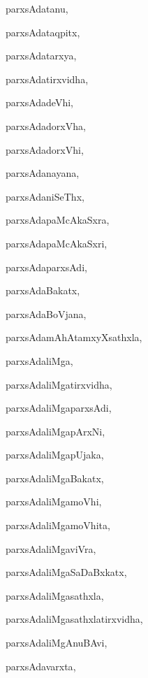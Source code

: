 \begin{multicols}{2}
{parxsAdatanu}, \pageref{parxsAdatanu}

{parxsAdataqpitx}, \pageref{parxsAdataqpitx}

{parxsAdatarxya}, \pageref{parxsAdatarxya}

{parxsAdatirxvidha}, \pageref{parxsAdatirxvidha}

{parxsAdadeVhi}, \pageref{parxsAdadeVhi}

{parxsAdadorxVha}, \pageref{parxsAdadorxVha}

{parxsAdadorxVhi}, \pageref{parxsAdadorxVhi}

{parxsAdanayana}, \pageref{parxsAdanayana}

{parxsAdaniSeThx}, \pageref{parxsAdaniSeThx}

{parxsAdapaMcAkaSxra}, \pageref{parxsAdapaMcAkaSxra}

{parxsAdapaMcAkaSxri}, \pageref{parxsAdapaMcAkaSxri}

{parxsAdaparxsAdi}, \pageref{parxsAdaparxsAdi}

{parxsAdaBakatx}, \pageref{parxsAdaBakatx}

{parxsAdaBoVjana}, \pageref{parxsAdaBoVjana}

{parxsAdamAhAtamxyXsathxla}, \pageref{parxsAdamAhAtamxyXsathxla}

{parxsAdaliMga}, \pageref{parxsAdaliMga}

{parxsAdaliMgatirxvidha}, \pageref{parxsAdaliMgatirxvidha}

{parxsAdaliMgaparxsAdi}, \pageref{parxsAdaliMgaparxsAdi}

{parxsAdaliMgapArxNi}, \pageref{parxsAdaliMgapArxNi}

{parxsAdaliMgapUjaka}, \pageref{parxsAdaliMgapUjaka}

{parxsAdaliMgaBakatx}, \pageref{parxsAdaliMgaBakatx}

{parxsAdaliMgamoVhi}, \pageref{parxsAdaliMgamoVhi}

{parxsAdaliMgamoVhita}, \pageref{parxsAdaliMgamoVhita}

{parxsAdaliMgaviVra}, \pageref{parxsAdaliMgaviVra}

{parxsAdaliMgaSaDaBxkatx}, \pageref{parxsAdaliMgaSaDaBxkatx}

{parxsAdaliMgasathxla}, \pageref{parxsAdaliMgasathxla}

{parxsAdaliMgasathxlatirxvidha}, \pageref{parxsAdaliMgasathxlatirxvidha}

{parxsAdaliMgAnuBAvi}, \pageref{parxsAdaliMgAnuBAvi}

{parxsAdavarxta}, \pageref{parxsAdavarxta}


\end{multicols}
